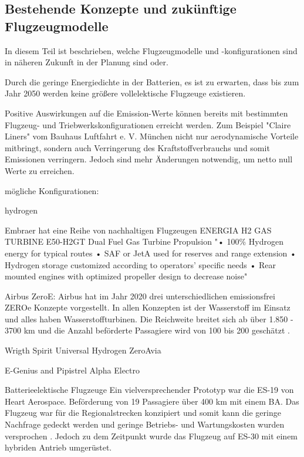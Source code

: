 \subsection{Bestehende Konzepte und zukünftige Flugzeugmodelle}
In diesem Teil ist beschrieben, welche Flugzeugmodelle und -konfigurationen sind in näheren Zukunft in der Planung sind oder.

Durch die geringe Energiedichte in der Batterien, es ist zu erwarten, dass bis zum Jahr 2050 werden keine größere vollelektische Flugzeuge
existieren.

Positive Auswirkungen auf die Emission-Werte können bereits mit bestimmten Flugzeug- und Triebwerkskonfigurationen erreicht werden.
Zum Beispiel "Claire Liners" vom Bauhaus Luftfahrt e. V. München nicht nur aerodynamische Vorteile mitbringt, 
sondern auch Verringerung des Kraftstoffverbrauchs und somit Emissionen verringern.
Jedoch sind mehr Änderungen notwendig, um netto null \cite{CO2} Werte zu erreichen.

mögliche Konfigurationen:

hydrogen

Embraer hat eine Reihe von nachhaltigen Flugzeugen ENERGIA H2 GAS TURBINE E50-H2GT Dual Fuel Gas Turbine Propulsion
"• 100\% Hydrogen energy for typical routes
• SAF or JetA used for reserves and range extension
• Hydrogen storage customized according to operators’ specific
needs
• Rear mounted engines with optimized propeller design to
decrease noise"

Airbus ZeroE: Airbus hat im Jahr 2020 drei unterschiedlichen emissionsfrei ZEROe Konzepte vorgestellt. 
In allen Konzepten ist der Wasserstoff im Einsatz und alles haben Wasserstoffturbinen. Die Reichweite breitet sich ab über 1.850 - 
3700 km und die Anzahl beförderte Passagiere wird von 100 bis 200 geschätzt \cite{airbus_zea_concepts}.

Wrigth Spirit
Universal Hydrogen
ZeroAvia

E-Genius and 
Pipistrel Alpha Electro

Batterieelektische Flugzeuge
Ein vielversprechender Prototyp war die ES-19 von Heart Aerospace. Beförderung von 19 Passagiere über 400 km mit einem BA. 
Das Flugzeug war für die Regionalstrecken konzipiert und somit kann die geringe Nachfrage gedeckt werden und geringe Betriebs- und Wartungskosten wurden versprochen .
Jedoch zu dem Zeitpunkt wurde das Flugzeug auf ES-30 mit einem hybriden Antrieb umgerüstet.